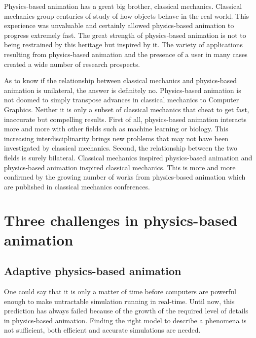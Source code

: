 Physics-based animation has a great big brother, classical mechanics. Classical mechanics group centuries of study of how objects behave in the real world. This experience was unvaluable and certainly allowed physics-based animation to progress extremely fast. The great strength of physics-based animation is not to being restrained by this heritage but inspired by it. The variety of applications resulting from physics-based animation and the presence of a user in many cases  created a wide number of research prospects.

As to know if the relationship between classical mechanics and physics-based animation is unilateral, the answer is definitely no. Physics-based animation is not doomed to simply transpose advances in classical mechanics to Computer Graphics. Neither it is only a subset of classical mechanics that cheat to get fast, inaccurate but compelling results. First of all, physics-based animation interacts more and more with other fields such as machine learning or biology. This increasing interdisciplinarity brings new problems that may not have been investigated by classical mechanics. Second, the relationship between the two fields is surely bilateral. Classical mechanics inspired physics-based animation and physics-based animation inspired classical mechanics. This is more and more confirmed by the growing number of works from physics-based animation which are published in classical mechanics conferences.

\section{Three challenges in physics-based animation}

\subsection{Adaptive physics-based animation}
One could say that it is only a matter of time before computers are powerful enough to make untractable simulation running in real-time. Until now, this prediction has always failed because of the growth of the required level of details in physics-based animation. Finding the right model to describe a phenomena is not sufficient, both efficient and accurate simulations are needed.

